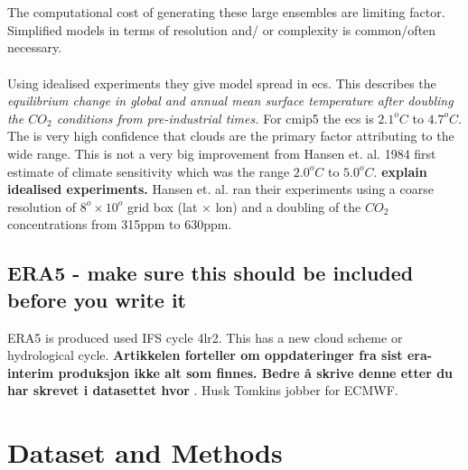 \\ \\
The computational cost of generating these large ensembles are limiting factor. Simplified models in terms of resolution and/ or complexity is common/often necessary. 
\\ \\ 
Using idealised experiments they give model spread in \acrfull{ecs}. This describes the \textit{equilibrium change in global and annual mean surface temperature after doubling the $CO_2$ conditions from pre-industrial times.} For \acrshort{cmip5} the \acrshort{ecs} is $2.1^oC$ to $4.7^oC$. The is very high confidence that clouds are the primary factor attributing to the wide range. This is not a very big improvement from Hansen et. al. 1984 first estimate of climate sensitivity which was the range $2.0^oC$ to $5.0^oC$. \textbf{explain idealised experiments.} Hansen et. al. ran their experiments using a coarse resolution of $8^o \times 10^o$ grid box (lat $\times$ lon) and a doubling of the $CO_2$ concentrations from 315ppm to 630ppm. 

\subsection{ERA5 - make sure this should be included before you write it} \label{sec:param_ERA5}
ERA5 is produced used IFS cycle 4lr2. This has a new cloud scheme or hydrological cycle. \textbf{Artikkelen forteller om oppdateringer fra sist era-interim produksjon ikke alt som finnes. Bedre å skrive denne etter du har skrevet i datasettet hvor }. Husk Tomkins jobber for ECMWF.

\section{Dataset and Methods}
